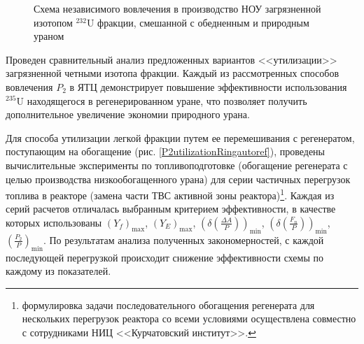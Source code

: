 \begin{figure}[ht]
  \caption{Схема независимого вовлечения в производство НОУ загрязненной изотопом $^{232}$U фракции, смешанной с обедненным и природным ураном}\label{P2utilizationautoref}
\end{figure}

Проведен сравнительный анализ предложенных вариантов <<утилизации>> загрязненной четными изотопа фракции. Каждый из рассмотренных способов вовлечения $P_2$ в ЯТЦ демонстрирует повышение эффективности использования $^{235}$U находящегося в регенерированном уране, что позволяет получить дополнительное увеличение экономии природного урана.

Для способа утилизации легкой фракции путем ее перемешивания с регенератом, поступающим на обогащение (рис. \ref{P2utilizationRingautoref}), проведены вычислительные эксперименты по топливоподготовке (обогащение регенерата с целью производства низкообогащенного урана) для серии частичных перегрузок топлива в реакторе (замена части ТВС активной зоны реактора)\footnote{формулировка задачи последовательного обогащения регенерата для нескольких перегрузок реактора со всеми условиями осуществлена совместно с сотрудниками НИЦ <<Курчатовский институт>>.}. Каждая из серий расчетов отличалась выбранным критерием эффективности, в качестве которых использованы $(Y_f)_\text{max}$, $(Y_{E})_\text{max}$, $(\delta(\frac{\Delta A}{P}))_\text{min}$, $(\delta(\frac{F_n}{P}))_\text{min}$, $(\frac{P_2}{P})_\text{min}$. По результатам анализа полученных закономерностей, с каждой последующей перегрузкой происходит снижение эффективности схемы по каждому из показателей.

